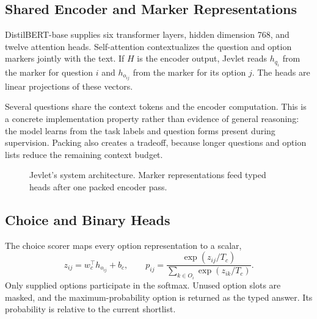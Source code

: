 \documentclass[conference]{IEEEtran}
\begin{document}
\subsection{Shared Encoder and Marker Representations}
DistilBERT-base supplies six transformer layers, hidden dimension 768, and twelve attention heads. Self-attention contextualizes the question and option markers jointly with the text. If $H$ is the encoder output, Jevlet reads $h_{q_i}$ from the marker for question $i$ and $h_{o_{ij}}$ from the marker for its option $j$. The heads are linear projections of these vectors.

Several questions share the context tokens and the encoder computation. This is a concrete implementation property rather than evidence of general reasoning: the model learns from the task labels and question forms present during supervision. Packing also creates a tradeoff, because longer questions and option lists reduce the remaining context budget.


\begin{figure}[t]
\centering
{}
\caption{Jevlet's system architecture. Marker representations feed typed heads after one packed encoder pass.}
\label{fig:architecture}
\end{figure}

\subsection{Choice and Binary Heads}
The choice scorer maps every option representation to a scalar,
\begin{equation}
z_{ij}=w_c^\top h_{o_{ij}}+b_c,\qquad
p_{ij}=\frac{\exp(z_{ij}/T_c)}{\sum_{k\in O_i}\exp(z_{ik}/T_c)}.
\end{equation}
Only supplied options participate in the softmax. Unused option slots are masked, and the maximum-probability option is returned as the typed answer. Its probability is relative to the current shortlist.
\end{document}
